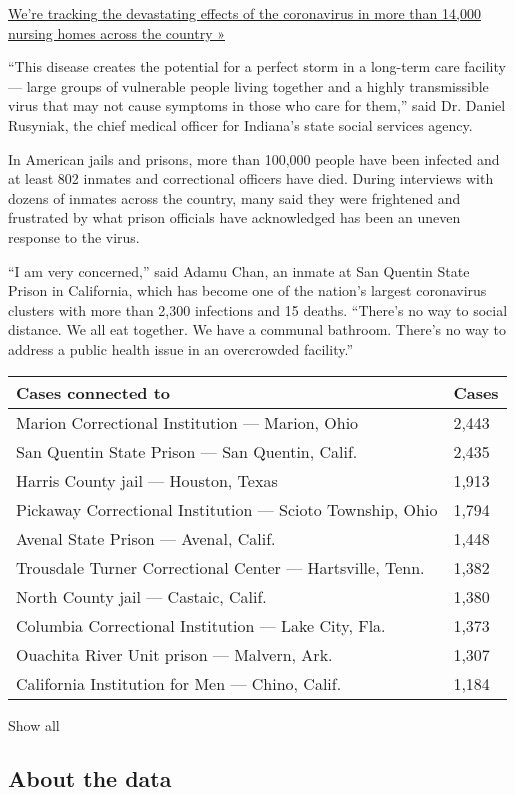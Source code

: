 \href{https://www.nytimes3xbfgragh.onion/interactive/2020/us/coronavirus-nursing-homes.html}{We're
tracking the devastating effects of the coronavirus in more than 14,000
nursing homes across the country »}

``This disease creates the potential for a perfect storm in a long-term
care facility --- large groups of vulnerable people living together and
a highly transmissible virus that may not cause symptoms in those who
care for them,'' said Dr. Daniel Rusyniak, the chief medical officer for
Indiana's state social services agency.

In American jails and prisons, more than 100,000 people have been
infected and at least 802 inmates and correctional officers have died.
During interviews with dozens of inmates across the country, many said
they were frightened and frustrated by what prison officials have
acknowledged has been an uneven response to the virus.

``I am very concerned,'' said Adamu Chan, an inmate at San Quentin State
Prison in California, which has become one of the nation's largest
coronavirus clusters with more than 2,300 infections and 15 deaths.
``There's no way to social distance. We all eat together. We have a
communal bathroom. There's no way to address a public health issue in an
overcrowded facility.''

\begin{longtable}[]{@{}ll@{}}
\toprule
Cases connected to & Cases\tabularnewline
\midrule
\endhead
Marion Correctional Institution --- Marion, Ohio & 2,443 \tabularnewline
San Quentin State Prison --- San Quentin, Calif. & 2,435 \tabularnewline
Harris County jail --- Houston, Texas & 1,913 \tabularnewline
Pickaway Correctional Institution --- Scioto Township, Ohio & 1,794
\tabularnewline
Avenal State Prison --- Avenal, Calif. & 1,448 \tabularnewline
Trousdale Turner Correctional Center --- Hartsville, Tenn. & 1,382
\tabularnewline
North County jail --- Castaic, Calif. & 1,380 \tabularnewline
Columbia Correctional Institution --- Lake City, Fla. & 1,373
\tabularnewline
Ouachita River Unit prison --- Malvern, Ark. & 1,307 \tabularnewline
California Institution for Men --- Chino, Calif. & 1,184 \tabularnewline
\bottomrule
\end{longtable}

Show all

\hypertarget{about-the-data}{%
\subsection{About the data}\label{about-the-data}}

